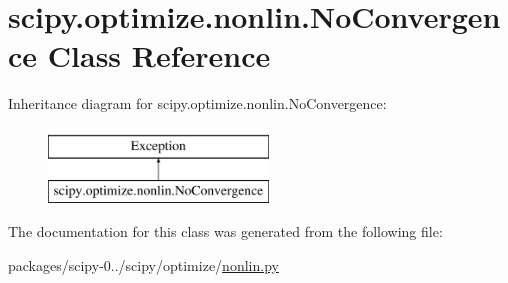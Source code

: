 \hypertarget{classscipy_1_1optimize_1_1nonlin_1_1NoConvergence}{}\section{scipy.\+optimize.\+nonlin.\+No\+Convergence Class Reference}
\label{classscipy_1_1optimize_1_1nonlin_1_1NoConvergence}
Inheritance diagram for scipy.\+optimize.\+nonlin.\+No\+Convergence\+:\begin{figure}[H]
\begin{center}
\leavevmode
\includegraphics[height=2.000000cm]{classscipy_1_1optimize_1_1nonlin_1_1NoConvergence}
\end{center}
\end{figure}


The documentation for this class was generated from the following file\+:\begin{DoxyCompactItemize}
\item 
packages/scipy-\/0../scipy/optimize/\hyperlink{nonlin_8py}{nonlin.\+py}\end{DoxyCompactItemize}
